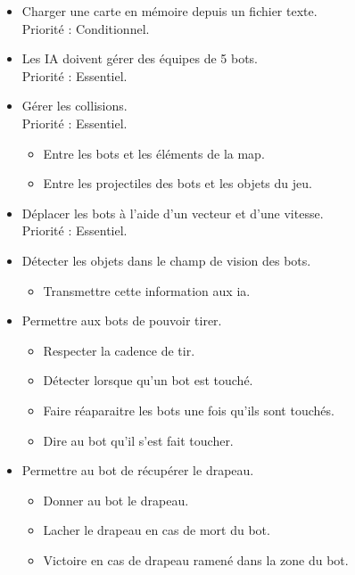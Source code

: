 \documentclass[french]{article}
\begin{document}
    \begin{itemize}

        \item Charger une carte en mémoire depuis un fichier texte. \\
                Priorité : Conditionnel.\\


        \item Les IA doivent gérer des équipes de 5 bots. \\
                Priorité : Essentiel.\\


        \item Gérer les collisions. \\
                Priorité : Essentiel.
                \begin{itemize}
                    \item Entre les bots et les éléments de la map.
                    \item Entre les projectiles des bots et les objets du jeu.\\
                \end{itemize}


        \item Déplacer les bots à l'aide d'un vecteur et d'une vitesse.\\
                Priorité : Essentiel.\\

                
        \item Détecter les objets dans le champ de vision des bots.
        \begin{itemize}
            \item Transmettre cette information aux ia.\\
        \end{itemize}
        
        \item Permettre aux bots de pouvoir tirer.
        \begin{itemize}
            \item Respecter la cadence de tir.
            \item Détecter lorsque qu'un bot est touché.
            \item Faire réaparaitre les bots une fois qu'ils sont touchés.
            \item Dire au bot qu'il s'est fait toucher.\\
        \end{itemize}


        \item Permettre au bot de récupérer le drapeau.
        \begin{itemize}
            \item Donner au bot le drapeau.
            \item Lacher le drapeau en cas de mort du bot.
            \item Victoire en cas de drapeau ramené dans la zone du bot.
        \end{itemize}
    \end{itemize}
\end{document}
